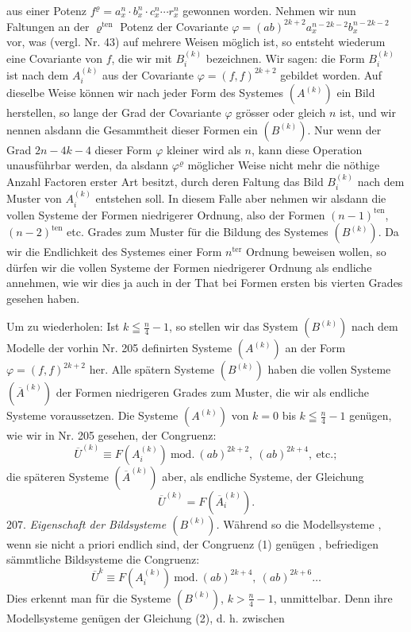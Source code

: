 \documentclass[11pt]{article}
\providecommand{\gesperrt}[1]{\textls[130]{#1}}
\providecommand{\weberpage}[1]{}
\providecommand{\weq}[2]{\begin{equation}\tag{#1}#2\end{equation}}
\begin{document}
\weberpage{233}
aus einer Potenz $f^\varrho = a_x^n \cdot b_x^n \cdot c_x^n \cdots r_x^n$ gewonnen worden. Nehmen
wir nun \gesperrt{genau dieselben} Faltungen an der $\varrho^{\mathrm{ten}}$ Potenz der Covariante
$\varphi = (ab)^{2k+2} a_x^{n-2k-2} b_x^{n-2k-2}$ vor, was (vergl. Nr. 43) auf mehrere
Weisen möglich ist, so entsteht wiederum eine Covariante von $f$, die
wir mit $B_i^{(k)}$ bezeichnen. Wir sagen: die Form $B_i^{(k)}$ ist nach dem
\gesperrt{Modell} $A_i^{(k)}$ aus der Covariante $\varphi = (f,f)^{2k+2}$ gebildet worden. Auf
dieselbe Weise können wir nach jeder Form des Systemes $(A^{(k)})$ ein
Bild herstellen, so lange der Grad der Covariante $\varphi$ grösser oder
gleich $n$ ist, und wir nennen alsdann die Gesammtheit dieser Formen
ein \gesperrt{System} $(B^{(k)})$. Nur wenn der Grad $2n - 4k - 4$ dieser Form
$\varphi$ kleiner wird als $n$, kann diese Operation unausführbar werden, da
alsdann $\varphi^\varrho$ möglicher Weise nicht mehr die nöthige Anzahl Factoren
erster Art besitzt, durch deren Faltung das Bild $B_i^{(k)}$ nach dem Muster
von $A_i^{(k)}$ entstehen soll. In diesem Falle aber nehmen wir alsdann
die vollen Systeme der Formen niedrigerer Ordnung, also der Formen
$(n-1)^{\mathrm{ten}}$, $(n-2)^{\mathrm{ten}}$ etc. Grades zum Muster für die Bildung des
Systemes $(B^{(k)})$. Da wir die Endlichkeit des Systemes einer Form
$n^{\mathrm{ter}}$ Ordnung beweisen wollen, so dürfen wir die vollen Systeme der
Formen niedrigerer Ordnung als endliche annehmen, wie wir dies ja
auch in der That bei Formen ersten bis vierten Grades gesehen haben.

Um zu wiederholen: Ist $k \leqq \frac{n}{4} - 1$, so stellen wir das System
$(B^{(k)})$ nach dem Modelle der vorhin Nr. 205 definirten Systeme $(A^{(k)})$
an der Form $\varphi = (f,f)^{2k+2}$ her. Alle spätern Systeme $(B^{(k)})$ haben
die vollen Systeme $(\overline{A}^{(k)})$ der Formen niedrigeren Grades zum Muster,
die wir als endliche Systeme voraussetzen. Die Systeme $(A^{(k)})$ von
$k = 0$ bis $k \leqq \frac{n}{4} - 1$ genügen, wie wir in Nr. 205 gesehen, der
Congruenz:
\weq{1}{\overline{U}^{(k)} \equiv F(A_i^{(k)}) \ \mathrm{mod.}\ (ab)^{2k+2},\ (ab)^{2k+4},\ \text{etc.};}
die späteren Systeme $(\overline{A}^{(k)})$ aber, als endliche Systeme, der Gleichung
\weq{2}{\overline{U}^{(k)} = F(\overline{A}_i^{(k)}).}
207. \textit{Eigenschaft der Bildsysteme $(B^{(k)})$.} Während so die Modellsysteme
, wenn sie nicht a priori endlich sind, der Congruenz (1) genügen
, befriedigen sämmtliche Bildsysteme die Congruenz:
\weq{3}{\overline{U}^{k} \equiv F(A_i^{(k)}) \ \mathrm{mod.}\ (ab)^{2k+4},\ (ab)^{2k+6} \ldots} %
Dies erkennt man für die Systeme $(B^{(k)})$, $k > \frac{n}{4} - 1$, unmittelbar.
Denn ihre Modellsysteme genügen der Gleichung (2), d. h. zwischen
\end{document}
